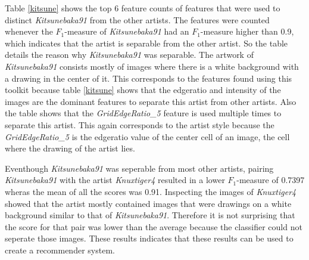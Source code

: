 Table \ref{kitsune} shows the top 6 feature counts of features that were used to distinct \textit{Kitsunebaka91} from the other artists.
The features were counted whenever the $F_1$-measure of \textit{Kitsunebaka91} had an $F_1$-measure higher than 0.9, which indicates that the artist is separable from the other artist.
So the table details the reason why \textit{Kitsunebaka91} was separable.
The artwork of \textit{Kitsunebaka91} consists mostly of images where there is a white background with a drawing in the center of it.
This corresponds to the features found using this toolkit because table \ref{kitsune} shows that the edgeratio and intensity of the images are the dominant features to separate this artist from other artists.
Also the table shows that the \textit{GridEdgeRatio\_5} feature is used multiple times to separate this artist.
This again corresponds to the artist style because the \textit{GridEdgeRatio\_5} is the edgeratio value of the center cell of an image, the cell where the drawing of the artist lies.

Eventhough \textit{Kitsunebaka91} was seperable from most other artists, pairing \textit{Kitsunebaka91} with the artist \textit{Knuxtiger4} resulted in a lower $F_1$-measure of 0.7397 wheras the mean of all the scores was 0.91.
Inspecting the images of \textit{Knuxtiger4} showed that the artist mostly contained images that were drawings on a white background similar to that of \textit{Kitsunebaka91}.
Therefore it is not surprising that the score for that pair was lower than the average because the classifier could not seperate those images.
These results indicates that these results can be used to create a recommender system.